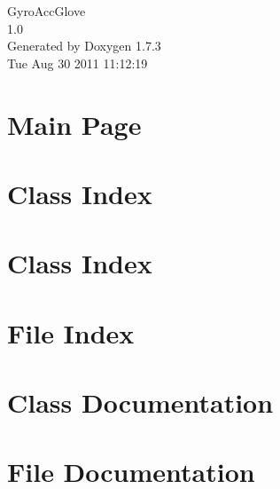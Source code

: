 \documentclass[a4paper]{book}
\begin{document}
\hypersetup{pageanchor=false}
\begin{titlepage}
\vspace*{7cm}
\begin{center}
{\Large GyroAccGlove \\[1ex]\large 1.0 }\\
\vspace*{1cm}
{\large Generated by Doxygen 1.7.3}\\
\vspace*{0.5cm}
{\small Tue Aug 30 2011 11:12:19}\\
\end{center}
\end{titlepage}
\clearemptydoublepage
{}
\tableofcontents
\clearemptydoublepage
{}
\hypersetup{pageanchor=true}
\chapter{Main Page}
\label{index}\hypertarget{index}{}
\chapter{Class Index}

\chapter{Class Index}

\chapter{File Index}

\chapter{Class Documentation}












\chapter{File Documentation}























\printindex
\end{document}
